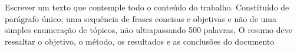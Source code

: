 Escrever um texto que contemple todo o conteúdo do trabalho. Constituído de parágrafo único; uma sequência de frases concisas e objetivas e não de uma simples enumeração de tópicos, não ultrapassando 500 palavras, O resumo deve ressaltar o objetivo, o método, os resultados e as conclusões do documento